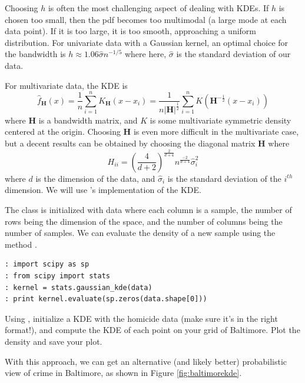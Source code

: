 Choosing $h$ is often the most challenging aspect of dealing with KDEs. If $h$ is chosen too small, then the pdf becomes too multimodal (a large mode at each data point). If it is too large, it is too smooth, approaching a uniform distribution. For univariate data with a Gaussian kernel, an optimal choice for the bandwidth is $h \approx 1.06\widehat{\sigma}n^{-1/5}$ where here, $\widehat{\sigma}$ is the standard deviation of our data.

For multivariate data, the KDE is 
\begin{equation*}
\widehat{f}_{\mathbf{H}}(x) = \frac{1}{n} \sum_{i=1}^{n} K_{\mathbf{H}}(x - x_{i}) = \frac{1}{n\lvert \mathbf{H} \rvert^{\frac{1}{2}}} \sum_{i=1}^{n} K(\mathbf{H}^{-\frac{1}{2}}(x - x_{i}))
\end{equation*}
where $\mathbf{H}$ is a bandwidth matrix, and $K$ is some multivariate symmetric density centered at the origin. Choosing $\mathbf{H}$ is even more difficult in the multivariate case, but a decent results can be obtained by choosing the diagonal matrix $\mathbf{H}$ where 
\begin{equation*}
H_{ii} = (\frac{4}{d+2})^{\frac{2}{d+4}} n^{\frac{-2}{d+4}} \widehat{\sigma}_{i}^{2}
\end{equation*}
where $d$ is the dimension of the data, and $\widehat{\sigma}_{i}$ is the standard deviation of the $i^{th}$ dimension. We will use 's implementation of the KDE.

The  class is initialized with data where each column is a sample, the number of rows being the dimension of the space, and the number of columns being the number of samples. We can evaluate the density of a new sample using the method .
\begin{lstlisting}
: import scipy as sp
: from scipy import stats
: kernel = stats.gaussian_kde(data)
: print kernel.evaluate(sp.zeros(data.shape[0]))
\end{lstlisting}

\begin{problem}
Using , initialize a KDE with the homicide data (make sure it's in the right format!), and compute the KDE of each point on your grid of Baltimore. Plot the density and save your plot.
\end{problem}

With this approach, we can get an alternative (and likely better) probabilistic view of crime in Baltimore, as shown in Figure \ref{fig:baltimorekde}.

